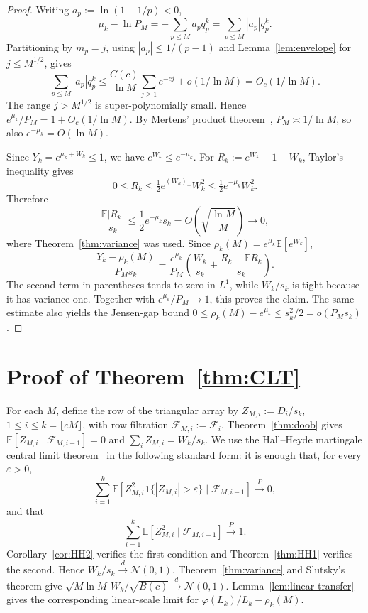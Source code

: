 \documentclass[11pt]{article}
\theoremstyle{remark}
\newcommand{\EE}{\mathbb{E}}
\newcommand{\NN}{\mathcal{N}}
\newcommand{\F}{\mathcal{F}}
\newcommand{\one}{\mathbf{1}}
\begin{document}
\begin{proof}
Writing $a_p:=\ln(1-1/p)<0$,
\[
\mu_k-\ln P_M=-\sum_{p\leq M}a_pq_p^k
=\sum_{p\leq M}|a_p|q_p^k.
\]
Partitioning by $m_p=j$, using $|a_p|\leq1/(p-1)$ and Lemma~\ref{lem:envelope} for $j\leq M^{1/2}$, gives
\[
\sum_{p\leq M}|a_p|q_p^k
\leq \frac{C(c)}{\ln M}\sum_{j\geq1}e^{-cj}+o(1/\ln M)
=O_c(1/\ln M).
\]
The range $j>M^{1/2}$ is super-polynomially small. Hence $e^{\mu_k}/P_M=1+O_c(1/\ln M)$. By Mertens' product theorem~\cite{Tenenbaum2015}, $P_M\asymp1/\ln M$, so also $e^{-\mu_k}=O(\ln M)$.

Since $Y_k=e^{\mu_k+W_k}\leq1$, we have $e^{W_k}\leq e^{-\mu_k}$. For
$R_k:=e^{W_k}-1-W_k$, Taylor's inequality gives
\[
0\leq R_k\leq \tfrac12 e^{(W_k)_+}W_k^2
\leq \tfrac12 e^{-\mu_k}W_k^2.
\]
Therefore
\[
\frac{\EE|R_k|}{s_k}
\leq \frac12 e^{-\mu_k}s_k
=O\!\left(\sqrt{\frac{\ln M}{M}}\right)\longrightarrow0,
\]
where Theorem~\ref{thm:variance} was used. Since $\rho_k(M)=e^{\mu_k}\EE[e^{W_k}]$,
\[
\frac{Y_k-\rho_k(M)}{P_Ms_k}
=\frac{e^{\mu_k}}{P_M}\left(\frac{W_k}{s_k}+\frac{R_k-\EE R_k}{s_k}\right).
\]
The second term in parentheses tends to zero in $L^1$, while $W_k/s_k$ is tight because it has variance one. Together with $e^{\mu_k}/P_M\to1$, this proves the claim. The same estimate also yields the Jensen-gap bound
$0\leq\rho_k(M)-e^{\mu_k}\leq s_k^2/2=o(P_Ms_k)$.
\end{proof}

\section{Proof of Theorem~\ref{thm:CLT}}\label{sec:conclusion-clt}

For each $M$, define the row of the triangular array by
$Z_{M,i}:=D_i/s_k$, $1\leq i\leq k=\lfloor cM\rfloor$, with row filtration $\F_{M,i}:=\F_i$. Theorem~\ref{thm:doob} gives
$\EE[Z_{M,i}\mid\F_{M,i-1}]=0$ and $\sum_iZ_{M,i}=W_k/s_k$. We use the Hall--Heyde martingale central limit theorem~\cite[Thm.~3.2]{HH} in the following standard form: it is enough that, for every $\varepsilon>0$,
\[
\sum_{i=1}^k\EE\!\left[Z_{M,i}^2\one\{|Z_{M,i}|>\varepsilon\}\mid\F_{M,i-1}\right]\xrightarrow{P}0,
\]
and that
\[
\sum_{i=1}^k\EE[Z_{M,i}^2\mid\F_{M,i-1}]\xrightarrow{P}1.
\]
Corollary~\ref{cor:HH2} verifies the first condition and Theorem~\ref{thm:HH1} verifies the second. Hence $W_k/s_k\xrightarrow{d}\NN(0,1)$. Theorem~\ref{thm:variance} and Slutsky's theorem give $\sqrt{M \ln M}\,W_k/\sqrt{B(c)}\xrightarrow{d}\NN(0,1)$. Lemma~\ref{lem:linear-transfer} gives the corresponding linear-scale limit for $\varphi(L_k)/L_k-\rho_k(M)$.
\end{document}
